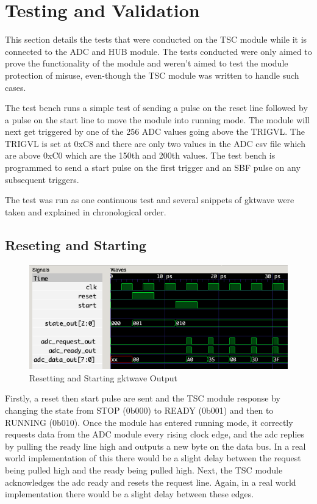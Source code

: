 \section{Testing and Validation}
This section details the tests that were conducted on the TSC module while it is connected to the ADC and HUB module.
The tests conducted were only aimed to prove the functionality of the module and weren't aimed to test the module protection of misuse, even-though the TSC module was written to handle such cases.

The test bench runs a simple test of sending a pulse on the reset line followed by a pulse on the start line to move the module into running mode.
The module will next get triggered by one of the 256 ADC values going above the TRIGVL.
The TRIGVL is set at 0xC8 and there are only two values in the ADC csv file which are above 0xC0 which are the 150th and 200th values.
The test bench is programmed to send a start pulse on the first trigger and an SBF pulse on any subsequent triggers.

The test was run as one continuous test and several snippets of gktwave were taken and explained in chronological order.

\subsection{Reseting and Starting}
\begin{figure}[H]
    \centering
    \includegraphics[width=\columnwidth]{Figures/Areset_start_adc}
    \caption{Resetting and Starting gktwave Output}
    \label{fig:testA}
\end{figure}

Firstly, a reset then start pulse are sent and the TSC module response by changing the state from STOP (0b000) to READY (0b001) and then to RUNNING (0b010).
Once the module has entered running mode, it correctly requests data from the ADC module every rising clock edge, and the adc replies by pulling the ready line high and outputs a new byte on the data bus.
In a real world implementation of this there would be a slight delay between the request being pulled high and the ready being pulled high.
Next, the TSC module acknowledges the adc ready and resets the request line.
Again, in a real world implementation there would be a slight delay between these edges.

